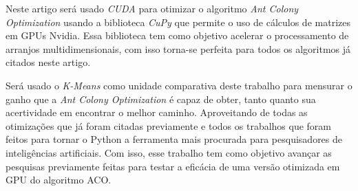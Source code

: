 Neste artigo será usado \emph{CUDA} para otimizar o algoritmo \emph{Ant Colony Optimization} usando a biblioteca
\emph{CuPy} \cite{Cupy} que permite o uso de cálculos de matrizes em GPUs Nvidia. Essa biblioteca
tem como objetivo acelerar o processamento de arranjos multidimensionais, com isso torna-se perfeita
para todos os algoritmos já citados neste artigo.

Será usado o \emph{K-Means} como unidade comparativa deste trabalho para mensurar 
o ganho que a \emph{Ant Colony Optimization} é capaz de obter, tanto quanto sua acertividade
em encontrar o melhor caminho. Aproveitando de todas as otimizações que já foram citadas previamente
e todos os trabalhos que foram feitos para tornar o Python a ferramenta mais procurada
para pesquisadores de inteligências artificiais. Com isso, esse trabalho tem como objetivo
avançar as pesquisas previamente feitas para testar a eficácia de uma versão otimizada em 
GPU do algoritmo ACO.